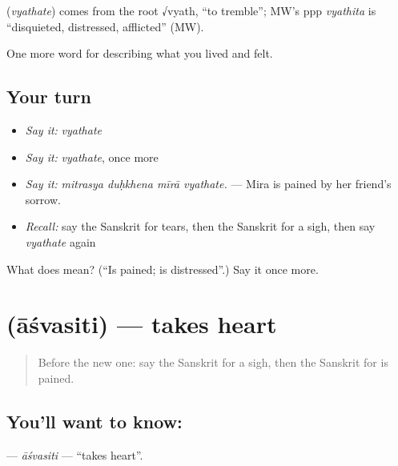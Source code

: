 \begin{cousinweb}
\textbf{} (\emph{vyathate}) comes from the root √vyath, \textquotedblleft{}to tremble\textquotedblright{}; MW's ppp \emph{vyathita} is \textquotedblleft{}disquieted, distressed, afflicted\textquotedblright{} (MW).
\end{cousinweb}

\begin{grammarlens}[title={What you've built}]
One more word for describing what you lived and felt.
\end{grammarlens}

\subsection*{Your turn}
\begin{itemize}
\raggedright
  \item \emph{Say it:} \emph{vyathate}
  \item \emph{Say it:} \emph{vyathate}, once more
  \item \emph{Say it:} \emph{mitrasya duḥkhena mīrā vyathate.} — Mira is pained by her friend's sorrow.
  \item \emph{Recall:} say the Sanskrit for tears, then the Sanskrit for a sigh, then say \emph{vyathate} again
\end{itemize}

\begin{tcolorbox}[breakable,colback=teal!4,colframe=teal!35!black,title={Before you move on}]
What does  mean? (\textquotedblleft{}Is pained; is distressed\textquotedblright{}.) Say it once more.
\end{tcolorbox}
\section[\texorpdfstring{\sk{आश्वसिति} (āśvasiti)}{आश्वसिति (āśvasiti)}]{ (āśvasiti) — takes heart}

\label{lesson:SA-C451-asvasiti}



\begin{quote}
Before the new one: say the Sanskrit for a sigh, then the Sanskrit for is pained.
\end{quote}

\subsection*{You'll want to know: }
\textbf{} — \emph{āśvasiti} — \textquotedblleft{}takes heart\textquotedblright{}.


